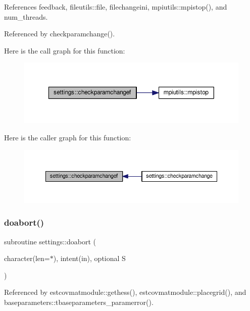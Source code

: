 References feedback, fileutils\+::file, filechangeini, mpiutils\+::mpistop(), and num\+\_\+threads.



Referenced by checkparamchange().

Here is the call graph for this function\+:
\nopagebreak
\begin{figure}[H]
\begin{center}
\leavevmode
\includegraphics[width=350pt]{namespacesettings_a7530516bc4d95e285559b9952d6f0dc2_cgraph}
\end{center}
\end{figure}
Here is the caller graph for this function\+:
\nopagebreak
\begin{figure}[H]
\begin{center}
\leavevmode
\includegraphics[width=350pt]{namespacesettings_a7530516bc4d95e285559b9952d6f0dc2_icgraph}
\end{center}
\end{figure}
\mbox{\label{namespacesettings_afa3df86ab753e05244ab370242ab2e5a}} 
\subsubsection{\texorpdfstring{doabort()}{doabort()}}
{\footnotesize\ttfamily subroutine settings\+::doabort (\begin{DoxyParamCaption}\item[{character(len=$\ast$), intent(in), optional}]{S }\end{DoxyParamCaption})}



Referenced by estcovmatmodule\+::gethess(), estcovmatmodule\+::placegrid(), and baseparameters\+::tbaseparameters\+\_\+paramerror().


